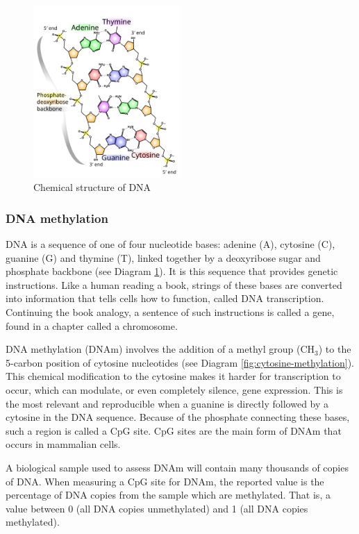 \documentclass{article} %
\begin{document}
\begin{figure}
    \centering
    \includegraphics[width=0.5\textwidth]{512px-DNA_chemical_structure.svg.png}
    \caption[Chemical structure of DNA]{Chemical structure of DNA \cite{ball_DNA_structure}}
    \label{fig:dna-structure}
\end{figure}

\subsubsection{DNA methylation}
DNA is a sequence of one of four nucleotide bases: adenine (A), cytosine (C), guanine (G) and thymine (T), linked together by a deoxyribose sugar and phosphate backbone (see Diagram \ref{fig:dna-structure}). It is this sequence that provides genetic instructions. Like a human reading a book, strings of these bases are converted into information that tells cells how to function, called DNA transcription. Continuing the book analogy, a sentence of such instructions is called a gene, found in a chapter called a chromosome.

DNA methylation (DNAm) involves the addition of a methyl group (CH\(_3\)) to the 5-carbon position of cytosine nucleotides (see Diagram \ref{fig:cytosine-methylation}). This chemical modification to the cytosine makes it harder for transcription to occur, which can modulate, or even completely silence, gene expression. This is the most relevant and reproducible when a guanine is directly followed by a cytosine in the DNA sequence. Because of the phosphate connecting these bases, such a region is called a CpG site. CpG sites are the main form of DNAm that occurs in mammalian cells.

A biological sample used to assess DNAm will contain many thousands of copies of DNA. When measuring a CpG site for DNAm, the reported value is the percentage of DNA copies from the sample which are methylated. That is, a value between 0 (all DNA copies unmethylated) and 1 (all DNA copies methylated).
\end{document}
